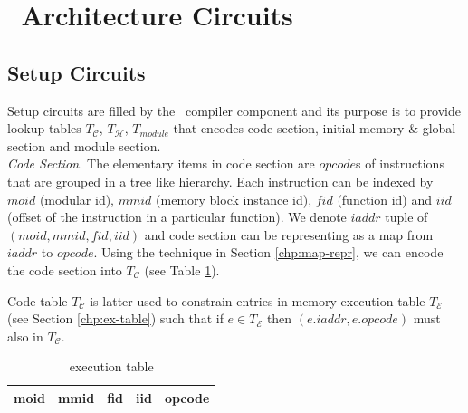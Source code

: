 \section{\zkwasm\, Architecture Circuits}
\label{chp:architecture-circuits}
\subsection{Setup Circuits}
Setup circuits are filled by the \zkwasm\, compiler component and its purpose is to provide lookup tables $T_\mathcal{C}$, $T_\mathcal{H}$, $T_{module}$ that encodes code section, initial memory \& global section and module section.\\

\noindent\emph{Code Section.}
The elementary items in code section are $opcode$s of instructions that are grouped in a tree like hierarchy. Each instruction can be indexed by $moid$ (modular id), $mmid$ (memory block instance id), $fid$ (function id) and $iid$ (offset of the instruction in a particular function). We denote $iaddr$ tuple of $(moid, mmid, fid, iid)$ and code section can be representing as a map from $iaddr$ to $opcode$. Using the technique in Section \ref{chp:map-repr}, we can encode the code section into $T_\mathcal{C}$ (see Table \ref{tbl:code-table}).

\smallskip\noindent Code table $T_\mathcal{C}$ is latter used to constrain entries in memory execution table $T_\mathcal{E}$ (see Section \ref{chp:ex-table}) such that if $e \in T_\mathcal{E}$ then $(e.iaddr, e.opcode)$ must also in $T_\mathcal{C}$. 

\begin{table}[!h]
\begin{center}
\begin{tabular}{ | c | c | c | c | c | }
  \hline
  moid & mmid & fid & iid & opcode \\ 
  \hline
\end{tabular}
\caption{execution table}
\label{tbl:code-table}
\end{center}
\end{table}

